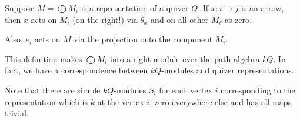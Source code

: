 Suppose $M = \bigoplus M_i$ is a representation of a quiver $Q$. If
$x\colon i\to j$ is an arrow, then $x$ acts on $M_i$ (on the right!) via $\theta_x$ and
on all other $M_\ell$ as zero.

Also, $e_i$ acts on $M$ via the projection onto the component $M_i$.

This definition makes $\bigoplus M_i$ into a right module over the path algebra $kQ$. In
fact, we have a correspondence between $kQ$-modules and quiver representations.

Note that there are simple $kQ$-modules $S_i$ for each vertex $i$ corresponding to
the representation which is $k$ at the vertex $i$, zero everywhere else and has
all maps trivial.

